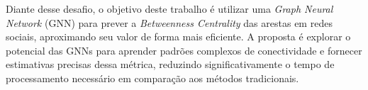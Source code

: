\documentclass[12pt]{article}
\begin{document}
Diante desse desafio, o objetivo deste trabalho é utilizar uma \textit{Graph Neural Network} (GNN) para prever a \textit{Betweenness Centrality} das arestas em redes sociais, aproximando seu valor de forma mais eficiente. A proposta é explorar o potencial das GNNs para aprender padrões complexos de conectividade e fornecer estimativas precisas dessa métrica, reduzindo significativamente o tempo de processamento necessário em comparação aos métodos tradicionais.











\end{document}
